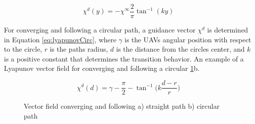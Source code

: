 \documentclass[conf]{new-aiaa}
\begin{document}

\begin{equation}\label{eq:lyapunovStraight}
\chi^d(y) = -\chi^{\infty}\frac{2}{\pi}\tan^{-1}(ky)
\end{equation}



For converging and following a circular path, a guidance vector $\chi^{d}$ is determined in Equation \ref{eq:lyapunovCirc}, where $\gamma$ is the UAVs angular position with respect to the circle, $r$ is the paths radius, $d$ is the distance from the circles center, and $k$ is a positive constant that determines the transition behavior. An example of a Lyapunov vector field for converging and following a circular \ref{fig:vfPrimitives}b.

\begin{equation}\label{eq:lyapunovCirc}
\chi^d(d) = \gamma-\frac{\pi}{2}-\tan^{-1} \bigg(k \frac{d-r}{r} \bigg)
\end{equation}


\begin{figure}[H]
	\begin{subfigmatrix}{2}%
		\centering	
		\hspace*{0mm}
	\end{subfigmatrix}
	\caption{Vector field converging and following a) straight path b) circular path}
	\label{fig:vfPrimitives}
\end{figure}
\end{document}

